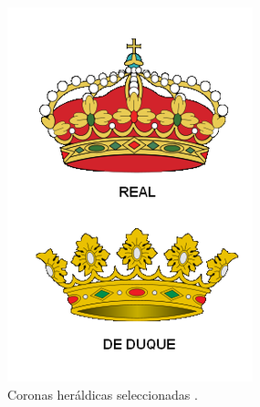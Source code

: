 \begin{itemize}
\begin{figure}[h!]
    \begin{minipage}{0.3\textwidth}
        \centering
        \includegraphics[width=\textwidth]{figuras/coronas.png}
        \caption{Coronas heráldicas seleccionadas \cite{coronas_wikipedia}.}
    \end{minipage}
    \hfill
    \begin{minipage}{0.3\textwidth}
        \centering

\end{minipage}
\end{figure}
\end{itemize}
